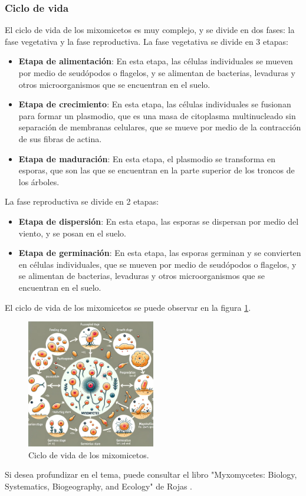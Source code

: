 \subsubsection{Ciclo de vida}
    El ciclo de vida de los mixomicetos es muy complejo, y se divide en dos fases: 
        la fase vegetativa y la fase reproductiva.
    \vskip 0.5cm
    La fase vegetativa se divide en 3 etapas:
    \begin{itemize}
        \item \textbf{Etapa de alimentaci\'on}: En esta etapa, las c\'elulas individuales 
            se mueven por medio de seud\'opodos o flagelos, y se alimentan de bacterias, 
            levaduras y otros microorganismos que se encuentran en el suelo.
        \item \textbf{Etapa de crecimiento}: En esta etapa, las c\'elulas individuales 
            se fusionan para formar un plasmodio, que es una masa de citoplasma multinucleado 
            sin separaci\'on de membranas celulares, que se mueve por medio de la contracci\'on 
            de sus fibras de actina.
        \item \textbf{Etapa de maduraci\'on}: En esta etapa, el plasmodio se transforma en 
            esporas, que son las que se encuentran en la parte superior de los troncos de los \'arboles.
    \end{itemize}
    \vskip 0.5cm
    La fase reproductiva se divide en 2 etapas:
    \begin{itemize}
        \item \textbf{Etapa de dispersi\'on}: En esta etapa, las esporas se dispersan por 
            medio del viento, y se posan en el suelo.
        \item \textbf{Etapa de germinaci\'on}: En esta etapa, las esporas germinan y se 
            convierten en c\'elulas individuales, que se mueven por medio de seud\'opodos 
            o flagelos, y se alimentan de bacterias, levaduras y otros microorganismos 
            que se encuentran en el suelo.
    \end{itemize}
    \vskip 0.5cm
    El ciclo de vida de los mixomicetos se puede observar en la figura \ref{fig:MixomicetoCicloVida}.
    \begin{figure}[h]
        \centering
        \includegraphics[width=0.5\textwidth]{./images/marco_teorico/Physarum/mixomiceto_ciclo_vida.png}
        \caption{Ciclo de vida de los mixomicetos.}
        \label{fig:MixomicetoCicloVida}
    \end{figure}
    \vskip 0.5cm
    Si desea profundizar en el tema, puede consultar el libro "Myxomycetes: Biology, Systematics, Biogeography, and Ecology" de Rojas \cite{Rojas2017}.
    \vskip 0.5cm